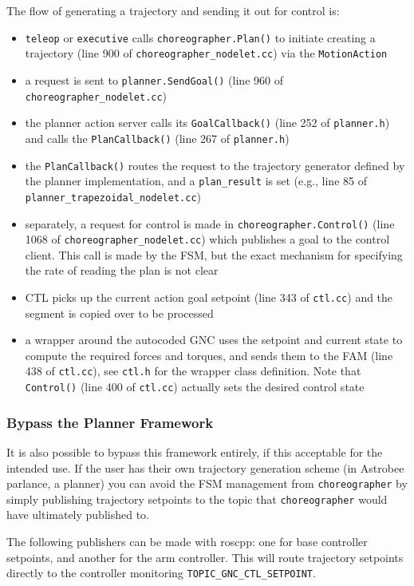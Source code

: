 \documentclass{article}
\begin{document}
The flow of generating a trajectory and sending it out for control is:
\begin{itemize}
	\item \texttt{teleop} or \texttt{executive} calls \texttt{choreographer.Plan()} to initiate creating a trajectory (line 900 of \texttt{choreographer\_nodelet.cc}) via the \texttt{MotionAction}
	\item a request is sent to \texttt{planner.SendGoal()} (line 960 of \texttt{choreographer\_nodelet.cc})
	\item the planner action server calls its \texttt{GoalCallback()} (line 252 of \texttt{planner.h}) and calls the \texttt{PlanCallback()} (line 267 of \texttt{planner.h})
	\item the \texttt{PlanCallback()} routes the request to the trajectory generator defined by the planner implementation, and a \texttt{plan\_result} is set (e.g., line 85 of \texttt{planner\_trapezoidal\_nodelet.cc})
	\item separately, a request for control is made in \texttt{choreographer.Control()} (line 1068 of \texttt{choreographer\_nodelet.cc}) which publishes a goal to the control client. This call is made by the FSM, but the exact mechanism for specifying the rate of reading the plan is not clear
	\item CTL picks up the current action goal setpoint (line 343 of \texttt{ctl.cc}) and the segment is copied over to be processed
	\item a wrapper around the autocoded GNC uses the setpoint and current state to compute the required forces and torques, and sends them to the FAM (line 438 of \texttt{ctl.cc}), see \texttt{ctl.h} for the wrapper class definition. Note that \texttt{Control()} (line 400 of \texttt{ctl.cc}) actually sets the desired control state
\end{itemize}

\subsubsection{Bypass the Planner Framework}

It is also possible to bypass this framework entirely, if this acceptable for the intended use. If the user has their own trajectory generation scheme (in Astrobee parlance, a planner) you can avoid the FSM management from \texttt{choreographer} by simply publishing trajectory setpoints to the topic that \texttt{choreographer} would have ultimately published to. 

The following publishers can be made with roscpp: one for base controller setpoints, and another for the arm controller. This will route trajectory setpoints directly to the controller monitoring \texttt{TOPIC\_GNC\_CTL\_SETPOINT}.
 
\end{document}
